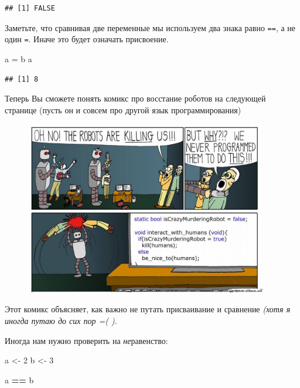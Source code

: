 \documentclass[]{book}
\newenvironment{Shaded}{\begin{snugshade}}{\end{snugshade}}
\newcommand{\DecValTok}[1]{\textcolor[rgb]{0.00,0.00,0.81}{#1}}
\newcommand{\StringTok}[1]{\textcolor[rgb]{0.31,0.60,0.02}{#1}}
\newcommand{\OperatorTok}[1]{\textcolor[rgb]{0.81,0.36,0.00}{\textbf{#1}}}
\newcommand{\NormalTok}[1]{#1}
\begin{document}
\begin{verbatim}
## [1] FALSE
\end{verbatim}

Заметьте, что сравнивая две переменные мы используем два знака равно
\texttt{==}, а не один \texttt{=}. Иначе это будет означать присвоение.

\begin{Shaded}
\begin{Highlighting}[]
\NormalTok{a =}\StringTok{ }\NormalTok{b}
\NormalTok{a}
\end{Highlighting}
\end{Shaded}

\begin{verbatim}
## [1] 8
\end{verbatim}

Теперь Вы сможете понять комикс про восстание роботов на следующей
странице (пусть он и совсем про другой язык программирования)

\begin{figure}
\centering
\includegraphics[width=4.16667in]{images/WaCM5x3mvQM.jpg}
\caption{}
\end{figure}

Этот комикс объясняет, как важно не путать присваивание и сравнение
\emph{(хотя я иногда путаю до сих пор =( )}.

Иногда нам нужно проверить на \emph{не}равенство:

\begin{Shaded}
\begin{Highlighting}[]
\NormalTok{a <-}\StringTok{ }\DecValTok{2}
\NormalTok{b <-}\StringTok{ }\DecValTok{3}

\NormalTok{a }\OperatorTok{==}\StringTok{ }\NormalTok{b}
\end{Highlighting}
\end{Shaded}
\end{document}
